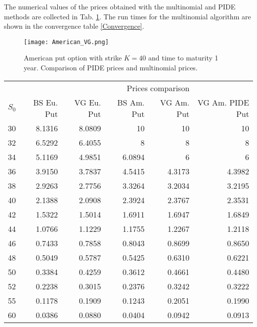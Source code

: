 \documentclass[]{interact}
\theoremstyle{plain}%
\theoremstyle{definition}
\theoremstyle{remark}
\begin{document}
The numerical values of the prices obtained with the multinomial and PIDE methods are collected in Tab. \ref{Option_values3}.
The run times for the multinomial algorithm are shown in the convergence table \ref{Convergence}.
\begin{figure}[ht!]
 \centering
 \texttt{[image: American\_VG.png]}
 \caption{American put option with strike $K=40$ and time to maturity 1 year. Comparison of PIDE prices and multinomial prices.}
 \label{AmVG}
\end{figure}
\begin{table}[!h]
{\begin{tabular}{lrrrrr} \toprule
& \multicolumn{4}{r}{Prices comparison} \\ \cmidrule{2-6}
  $S_0$ & BS Eu. Put & VG Eu. Put & BS Am. Put & VG Am. Put & VG Am. PIDE Put \\ \midrule
  30 & 8.1316 & 8.0809 & 10     & 10     & 10 \\
  32 & 6.5292 & 6.4055 & 8      & 8      & 8 \\
  34 & 5.1169 & 4.9851 & 6.0894 & 6      & 6 \\
  36 & 3.9150 & 3.7837 & 4.5415 & 4.3173 & 4.3982 \\
  38 & 2.9263 & 2.7756 & 3.3264 & 3.2034 & 3.2195 \\
  40 & 2.1388 & 2.0908 & 2.3924 & 2.3767 & 2.3531 \\
  42 & 1.5322 & 1.5014 & 1.6911 & 1.6947 & 1.6849 \\
  44 & 1.0766 & 1.1229 & 1.1755 & 1.2267 & 1.2118 \\
  46 & 0.7433 & 0.7858 & 0.8043 & 0.8699 & 0.8650 \\
  48 & 0.5049 & 0.5787 & 0.5425 & 0.6310 & 0.6221 \\
  50 & 0.3384 & 0.4259 & 0.3612 & 0.4661 & 0.4480 \\ 
  52 & 0.2238 & 0.3015 & 0.2376 & 0.3242 & 0.3222 \\
  55 & 0.1178 & 0.1909 & 0.1243 & 0.2051 & 0.1990 \\
  60 & 0.0386 & 0.0880 & 0.0404 & 0.0942 & 0.0913 \\ \bottomrule
  \end{tabular}}
  \label{Option_values3}
\end{table}
\end{document}
